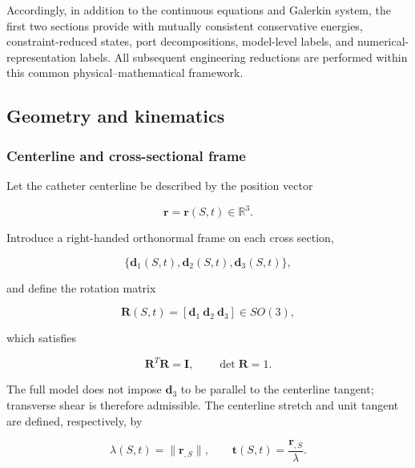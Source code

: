 Accordingly, in addition to the continuous equations and Galerkin system, the first two sections provide  with mutually consistent conservative energies, constraint-reduced states, port decompositions, model-level labels, and numerical-representation labels. All subsequent engineering reductions are performed within this common physical--mathematical framework.

\subsection{Geometry and kinematics}\label{sec:rod-1-2}

\subsubsection{Centerline and cross-sectional frame}\label{sec:rod-1-2-1}

Let the catheter centerline be described by the position vector

\begin{equation}
\label{eq:rod-1-2}
\mathbf{r} = \mathbf{r}(S,t) \in \mathbb{R}^{3}.
\end{equation}

Introduce a right-handed orthonormal frame on each cross section,

\begin{equation}
\label{eq:rod-1-3}
\{\mathbf{d}_{1}(S,t),\mathbf{d}_{2}(S,t),\mathbf{d}_{3}(S,t)\},
\end{equation}

and define the rotation matrix

\begin{equation}
\label{eq:rod-1-4}
\mathbf{R}(S,t) = \left\lbrack \mathbf{d}_{1}\ \mathbf{d}_{2}\ \mathbf{d}_{3} \right\rbrack \in SO(3),
\end{equation}

which satisfies

\begin{equation}
\label{eq:rod-1-5}
\mathbf{R}^{T}\mathbf{R} = \mathbf{I},\quad\quad\det\mathbf{R} = 1.
\end{equation}

The full model does not impose \(\mathbf{d}_{3}\) to be parallel to the centerline tangent; transverse shear is therefore admissible. The centerline stretch and unit tangent are defined, respectively, by

\begin{equation}
\label{eq:rod-1-6}
\lambda(S,t) = \parallel \mathbf{r}_{,S} \parallel ,\quad\quad\mathbf{t}(S,t) = \frac{\mathbf{r}_{,S}}{\lambda}.
\end{equation}

